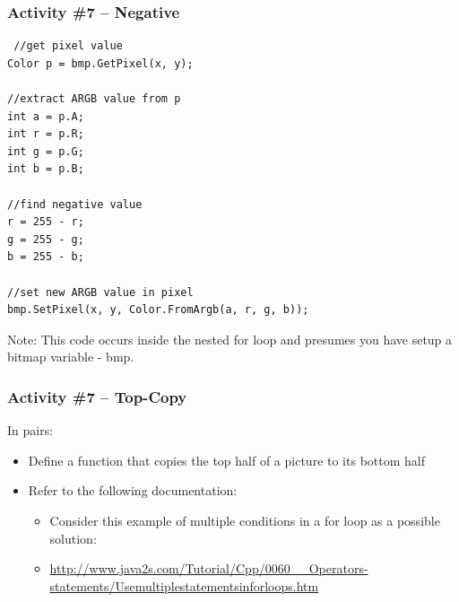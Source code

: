 \begin{frame}[fragile]
	\frametitle{Activity \#7 -- Negative}
	
\begin{lstlisting}
 //get pixel value
Color p = bmp.GetPixel(x, y);

//extract ARGB value from p
int a = p.A;
int r = p.R;
int g = p.G;
int b = p.B;

//find negative value
r = 255 - r;
g = 255 - g;
b = 255 - b;

//set new ARGB value in pixel
bmp.SetPixel(x, y, Color.FromArgb(a, r, g, b));
\end{lstlisting}

Note: This code occurs inside the nested for loop and presumes you have setup a bitmap variable - bmp.

\end{frame}

\begin{frame}
	\frametitle{Activity \#7 -- Top-Copy}
	
	In pairs:
	
	\vspace{2em}
	
	\begin{itemize}
		\item Define a function that copies the top half of a picture to its bottom half
		\item Refer to the following documentation:
		\begin{itemize}
			\item Consider this example of multiple conditions in a for loop as a possible solution:
			\item \url{http://www.java2s.com/Tutorial/Cpp/0060__Operators-statements/Usemultiplestatementsinforloops.htm}
		\end{itemize}
	\end{itemize}
\end{frame}

